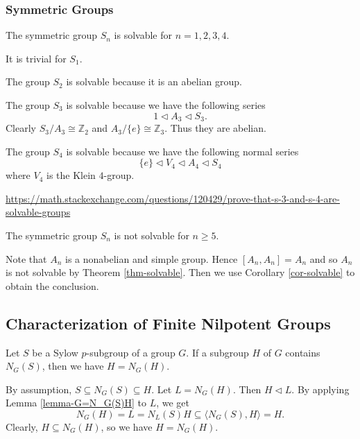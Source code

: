 \subsubsection{Symmetric Groups}
\begin{proposition}
	The symmetric group $S_n$ is solvable for $n=1,2,3,4$.
\end{proposition}
\begin{sketch} It is trivial for $S_1$.
	

	The group $S_2$ is solvable because it is an abelian group.
	
	The group $S_3$ is solvable because we have the following series
	\begin{equation*}
		1 \lhd A_3 \lhd S_3.
	\end{equation*}
	Clearly  $S_3/A_3\cong \mathbb{Z}_2$ and $A_3/\{e\} \cong \mathbb{Z}_3$. Thus they are abelian.  
	
	The group $S_4$ is solvable because we have the following normal series
	\begin{equation*}
		\{e\} \lhd V_4 \lhd A_4\lhd S_4
	\end{equation*}
	where $V_4$ is the Klein $4$-group.
	
	\url{https://math.stackexchange.com/questions/120429/prove-that-s-3-and-s-4-are-solvable-groups}
\end{sketch}
\begin{proposition}
	The symmetric group $S_n$ is not solvable for $n\geq 5$.
\end{proposition}
\begin{sketch}
	Note that $A_n$ is a nonabelian and simple group. Hence $[A_n,A_n] = A_n$ and so $A_n$ is not solvable by Theorem \ref{thm-solvable}. Then we use Corollary \ref{cor-solvable} to obtain the conclusion.
\end{sketch}

\subsection{Characterization of Finite Nilpotent Groups}



\begin{lemma} \label{lemma-H=N_G(H)}
	Let $S$ be a Sylow $p$-subgroup of a group $G$. If a subgroup $H$ of $G$ contains $N_G(S)$, then we have $H = N_G(H)$.
\end{lemma}
\begin{sketch}
	By assumption, $S \subseteq N_G(S) \subseteq H$. Let $L = N_G(H)$. Then $H\lhd L$. By applying Lemma \ref{lemma-G=N_G(S)H} to $L$, we  get
	$$N_G(H)=L = N_L(S)H \subseteq \langle N_G(S), H \rangle = H.$$
	Clearly, $H \subseteq N_G(H)$, so we have $H = N_G(H)$.
\end{sketch}

